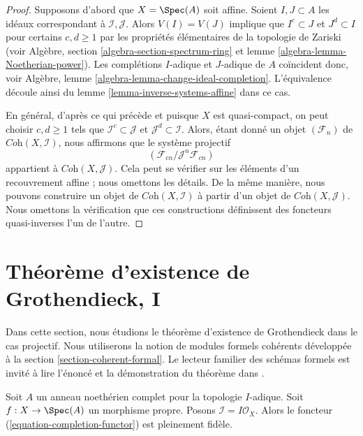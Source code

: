 \begin{proof}
Supposons d'abord que $X = \Spec(A)$ soit affine. Soient $I, J \subset A$ les idéaux
correspondant à $\mathcal{I}, \mathcal{J}$. Alors $V(I) = V(J)$
implique que $I^c \subset J$ et $J^d \subset I$ pour certains $c, d \geq 1$
par les propriétés élémentaires de la topologie de
Zariski (voir Algèbre, section \ref{algebra-section-spectrum-ring} et
lemme \ref{algebra-lemma-Noetherian-power}).
Les complétions $I$-adique et $J$-adique de $A$ coïncident donc,
voir Algèbre, lemme \ref{algebra-lemma-change-ideal-completion}.
L'équivalence découle ainsi du lemme \ref{lemma-inverse-systems-affine}
dans ce cas.

\medskip\noindent
En général, d'après ce qui précède et puisque
$X$ est quasi-compact, on peut choisir $c, d \geq 1$ tels que
$\mathcal{I}^c \subset \mathcal{J}$ et $\mathcal{J}^d \subset \mathcal{I}$.
Alors, étant donné un objet $(\mathcal{F}_n)$ de
$\textit{Coh}(X, \mathcal{I})$, nous affirmons que le
système projectif
$$
(\mathcal{F}_{cn}/\mathcal{J}^n\mathcal{F}_{cn})
$$
appartient à $\textit{Coh}(X, \mathcal{J})$. Cela peut se vérifier sur
les éléments d'un recouvrement affine ; nous omettons les détails.
De la même manière, nous pouvons construire un objet de
$\textit{Coh}(X, \mathcal{I})$ à partir d'un objet de
$\textit{Coh}(X, \mathcal{J})$. Nous omettons la vérification que
ces constructions définissent des foncteurs quasi-inverses l'un de l'autre.
\end{proof}





\section{Théorème d'existence de Grothendieck, I}
\label{section-existence}

\noindent
Dans cette section, nous étudions le théorème d'existence de Grothendieck dans
le cas projectif. Nous utiliserons la notion de modules formels cohérents développée
à la section \ref{section-coherent-formal}. Le lecteur familier des
schémas formels est invité à lire l'énoncé et la démonstration
du théorème dans \cite{EGA}.

\begin{lemma}
\label{lemma-fully-faithful}
Soit $A$ un anneau noethérien complet pour la topologie $I$-adique.
Soit $f : X \to \Spec(A)$ un morphisme propre. Posons
$\mathcal{I} = I\mathcal{O}_X$.
Alors le foncteur (\ref{equation-completion-functor}) est pleinement fidèle.
\end{lemma}

